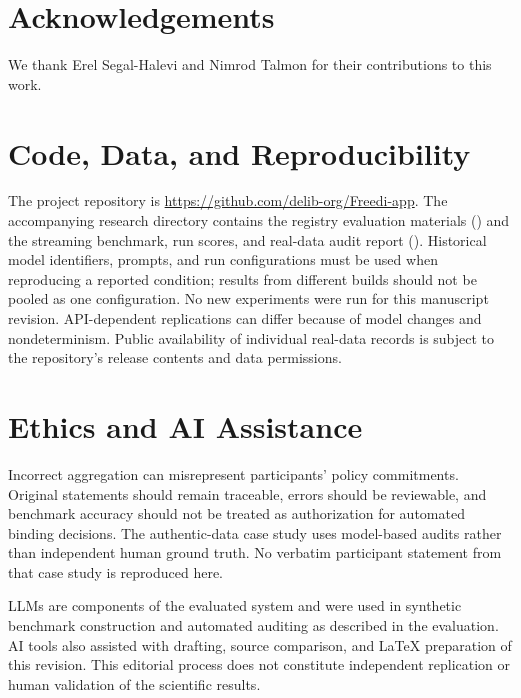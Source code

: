 \documentclass[11pt,a4paper]{article}
\begin{document}
\section*{Acknowledgements}
We thank Erel Segal-Halevi and Nimrod Talmon for their contributions to this work.

\section*{Code, Data, and Reproducibility}
The project repository is \url{https://github.com/delib-org/Freedi-app}. The accompanying research directory contains the registry evaluation materials () and the streaming benchmark, run scores, and real-data audit report (). Historical model identifiers, prompts, and run configurations must be used when reproducing a reported condition; results from different builds should not be pooled as one configuration. No new experiments were run for this manuscript revision. API-dependent replications can differ because of model changes and nondeterminism. Public availability of individual real-data records is subject to the repository's release contents and data permissions.

\section*{Ethics and AI Assistance}
Incorrect aggregation can misrepresent participants' policy commitments. Original statements should remain traceable, errors should be reviewable, and benchmark accuracy should not be treated as authorization for automated binding decisions. The authentic-data case study uses model-based audits rather than independent human ground truth. No verbatim participant statement from that case study is reproduced here.

LLMs are components of the evaluated system and were used in synthetic benchmark construction and automated auditing as described in the evaluation. AI tools also assisted with drafting, source comparison, and \LaTeX{} preparation of this revision. This editorial process does not constitute independent replication or human validation of the scientific results.



\end{document}
